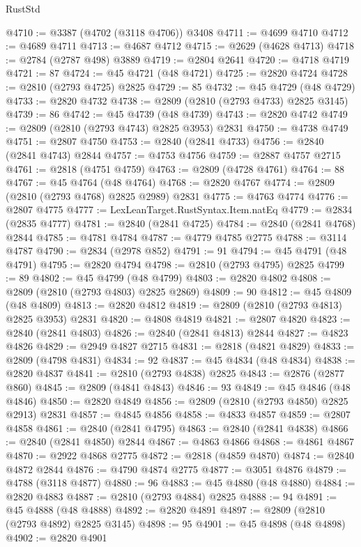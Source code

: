\begin{lexlean}{RustStd}
\begin{coremodule}
{\begin{coremodule}
{{{{{{{{{{{{{{{{{{{{{{{{{{{{{{{{{@4710 := @3387 (@4702 (@3118 @4706)) @3408
@4711 := @4699 @4710
@4712 := @4689 @4711
@4713 := @4687 @4712
@4715 := @2629 (@4628 @4713)
@4718 := @2784 (@2787 @498) @3889
@4719 := @2804 @2641
@4720 := @4718 @4719
@4721 := 87
@4724 := @45 @4721 (@48 @4721)
@4725 := @2820 @4724
@4728 := @2810 (@2793 @4725) @2825
@4729 := 85
@4732 := @45 @4729 (@48 @4729)
@4733 := @2820 @4732
@4738 := @2809 (@2810 (@2793 @4733) @2825 @3145)
@4739 := 86
@4742 := @45 @4739 (@48 @4739)
@4743 := @2820 @4742
@4749 := @2809 (@2810 (@2793 @4743) @2825 @3953) @2831
@4750 := @4738 @4749
@4751 := @2807 @4750
@4753 := @2840 (@2841 @4733)
@4756 := @2840 (@2841 @4743) @2844
@4757 := @4753 @4756
@4759 := @2887 @4757 @2715
@4761 := @2818 (@4751 @4759)
@4763 := @2809 (@4728 @4761)
@4764 := 88
@4767 := @45 @4764 (@48 @4764)
@4768 := @2820 @4767
@4774 := @2809 (@2810 (@2793 @4768) @2825 @2989) @2831
@4775 := @4763 @4774
@4776 := @2807 @4775
@4777 := LexLeanTarget.RustSyntax.Item.natEq
@4779 := @2834 (@2835 @4777)
@4781 := @2840 (@2841 @4725)
@4784 := @2840 (@2841 @4768) @2844
@4785 := @4781 @4784
@4787 := @4779 @4785 @2775
@4788 := @3114 @4787
@4790 := @2834 (@2978 @852)
@4791 := 91
@4794 := @45 @4791 (@48 @4791)
@4795 := @2820 @4794
@4798 := @2810 (@2793 @4795) @2825
@4799 := 89
@4802 := @45 @4799 (@48 @4799)
@4803 := @2820 @4802
@4808 := @2809 (@2810 (@2793 @4803) @2825 @2869)
@4809 := 90
@4812 := @45 @4809 (@48 @4809)
@4813 := @2820 @4812
@4819 := @2809 (@2810 (@2793 @4813) @2825 @3953) @2831
@4820 := @4808 @4819
@4821 := @2807 @4820
@4823 := @2840 (@2841 @4803)
@4826 := @2840 (@2841 @4813) @2844
@4827 := @4823 @4826
@4829 := @2949 @4827 @2715
@4831 := @2818 (@4821 @4829)
@4833 := @2809 (@4798 @4831)
@4834 := 92
@4837 := @45 @4834 (@48 @4834)
@4838 := @2820 @4837
@4841 := @2810 (@2793 @4838) @2825
@4843 := @2876 (@2877 @860)
@4845 := @2809 (@4841 @4843)
@4846 := 93
@4849 := @45 @4846 (@48 @4846)
@4850 := @2820 @4849
@4856 := @2809 (@2810 (@2793 @4850) @2825 @2913) @2831
@4857 := @4845 @4856
@4858 := @4833 @4857
@4859 := @2807 @4858
@4861 := @2840 (@2841 @4795)
@4863 := @2840 (@2841 @4838)
@4866 := @2840 (@2841 @4850) @2844
@4867 := @4863 @4866
@4868 := @4861 @4867
@4870 := @2922 @4868 @2775
@4872 := @2818 (@4859 @4870)
@4874 := @2840 @4872 @2844
@4876 := @4790 @4874 @2775
@4877 := @3051 @4876
@4879 := @4788 (@3118 @4877)
@4880 := 96
@4883 := @45 @4880 (@48 @4880)
@4884 := @2820 @4883
@4887 := @2810 (@2793 @4884) @2825
@4888 := 94
@4891 := @45 @4888 (@48 @4888)
@4892 := @2820 @4891
@4897 := @2809 (@2810 (@2793 @4892) @2825 @3145)
@4898 := 95
@4901 := @45 @4898 (@48 @4898)
@4902 := @2820 @4901
}}}}}}}}}}}}}}}}}}}}}}}}}}}}}}}}}
\end{coremodule}}
\end{coremodule}
\end{lexlean}
